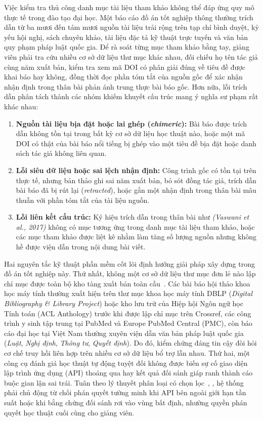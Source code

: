 Việc kiểm tra thủ công danh mục tài liệu tham khảo không thể đáp ứng quy mô thực tế trong đào tạo đại học. Một báo cáo đồ án tốt nghiệp thông thường trích dẫn từ ba mươi đến tám mươi nguồn tài liệu trải rộng trên tạp chí bình duyệt, kỷ yếu hội nghị, sách chuyên khảo, tài liệu đặc tả kỹ thuật trực tuyến và văn bản quy phạm pháp luật quốc gia. Để rà soát từng mục tham khảo bằng tay, giảng viên phải tra cứu nhiều cơ sở dữ liệu thư mục khác nhau, đối chiếu họ tên tác giả cùng năm xuất bản, kiểm tra xem mã DOI có phân giải đúng về tiêu đề được khai báo hay không, đồng thời đọc phần tóm tắt của nguồn gốc để xác nhận nhận định trong thân bài phản ánh trung thực bài báo gốc. Hơn nữa, lỗi trích dẫn phân tách thành các nhóm khiếm khuyết cấu trúc mang ý nghĩa sư phạm rất khác nhau:
\begin{enumerate}
    \item \textbf{Nguồn tài liệu bịa đặt hoặc lai ghép (\textit{chimeric}):} Bài báo được trích dẫn không tồn tại trong bất kỳ cơ sở dữ liệu học thuật nào, hoặc một mã DOI có thật của bài báo nổi tiếng bị ghép vào một tiêu đề bịa đặt hoặc danh sách tác giả không liên quan.
    \item \textbf{Lỗi siêu dữ liệu hoặc sai lệch nhận định:} Công trình gốc có tồn tại trên thực tế, nhưng bản thảo ghi sai năm xuất bản, bỏ sót đồng tác giả, trích dẫn bài báo đã bị rút lại (\textit{retracted}), hoặc gắn một nhận định trong thân bài mâu thuẫn với phần tóm tắt của tài liệu nguồn.
    \item \textbf{Lỗi liên kết cấu trúc:} Ký hiệu trích dẫn trong thân bài như \textit{(Vaswani et al., 2017)} không có mục tương ứng trong danh mục tài liệu tham khảo, hoặc các mục tham khảo được liệt kê nhằm làm tăng số lượng nguồn nhưng không hề được viện dẫn trong nội dung bài viết.
\end{enumerate}

Hai nguyên tắc kỹ thuật phần mềm cốt lõi định hướng giải pháp xây dựng trong đồ án tốt nghiệp này. Thứ nhất, không một cơ sở dữ liệu thư mục đơn lẻ nào lập chỉ mục được toàn bộ kho tàng xuất bản toàn cầu~\cite{visser2021bibliographic}. Các bài báo hội thảo khoa học máy tính thường xuất hiện trên thư mục khoa học máy tính DBLP (\textit{Digital Bibliography \& Library Project}) hoặc kho lưu trữ của Hiệp hội Ngôn ngữ học Tính toán (ACL Anthology) trước khi được lập chỉ mục trên Crossref, các công trình y sinh tập trung tại PubMed và Europe PubMed Central (PMC), còn báo cáo đại học tại Việt Nam thường xuyên viện dẫn văn bản pháp luật quốc gia (\textit{Luật}, \textit{Nghị định}, \textit{Thông tư}, \textit{Quyết định}). Do đó, kiểm chứng đáng tin cậy đòi hỏi cơ chế truy hồi liên hợp trên nhiều cơ sở dữ liệu bổ trợ lẫn nhau. Thứ hai, một công cụ đánh giá học thuật tự động tuyệt đối không được biến sự cố giao diện lập trình ứng dụng (API) thoáng qua hay kết quả đối sánh giáp ranh thành cáo buộc gian lận sai trái. Tuân theo lý thuyết phân loại có chọn lọc~\cite{chow1970optimum}, \cite{Geifman2017}, hệ thống phải chủ động từ chối phán quyết tường minh khi API bên ngoài giới hạn tần suất hoặc khi bằng chứng đối sánh rơi vào vùng bất định, nhường quyền phán quyết học thuật cuối cùng cho giảng viên.

